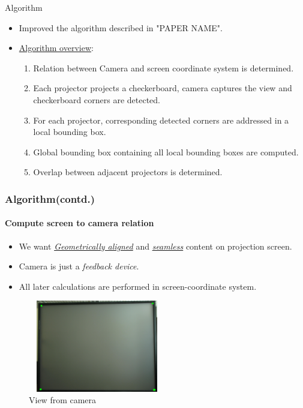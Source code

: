 \documentclass{beamer}
\begin{document}
\begin{frame}{Algorithm}
\begin{itemize}
\item Improved the algorithm described in "PAPER NAME".
\item \underline{Algorithm overview}:
\begin{enumerate}
\item Relation between Camera and screen coordinate system is determined.
\item Each projector projects a checkerboard, camera captures the view and checkerboard corners are detected.
\item For each projector, corresponding detected corners are addressed in a local bounding box. 
\item Global bounding box containing all local bounding boxes are computed. 
\item Overlap between adjacent projectors is determined. 
\end{enumerate}
\end{itemize}
\end{frame}


\begin{frame}
\frametitle{Algorithm(contd.)}
\framesubtitle{Compute screen to camera relation}
\begin{itemize}
\item We want \hyperlink{concept}{\textit{Geometrically aligned}} and \hyperlink{concept}{\textit{seamless}} content on projection screen.
\item Camera is just a \textit{feedback device}.
\item All later calculations are performed in screen-coordinate system.
\end{itemize}

\begin{figure}
\includegraphics[width=6cm, height = 4cm]{figures/debug_image_features.jpg}
\caption{View from camera}
\end{figure}
\end{frame}
\end{document}
